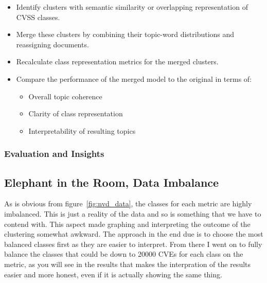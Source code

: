 \documentclass[12pt]{article}
\begin{document}
\begin{itemize}

	\item Identify clusters with semantic similarity or overlapping representation of CVSS classes.

	\item Merge these clusters by combining their topic-word distributions and reassigning documents.

	\item Recalculate class representation metrics for the merged clusters.

	\item Compare the performance of the merged model to the original in terms of:

	      \begin{itemize}

		      \item Overall topic coherence

		      \item Clarity of class representation

		      \item Interpretability of resulting topics

	      \end{itemize}

\end{itemize}

\subsubsection{Evaluation and Insights}

\subsection{Elephant in the Room, Data Imbalance}

As is obvious from figure~\ref{fig:nvd_data}, the classes for each metric are highly imbalanced.
This is just a reality of the data and so is something that we have to contend with. This aspect
made graphing and interpreting the outcome of the clustering somewhat awkward. The approach in the
end due is to choose the most balanced classes first as they are easier to interpret. From there I
went on to fully balance the classes that could be down to 20000 CVEs for each class on the metric,
as you will see in the results that makes the interpration of the results easier and more honest,
even if it is actually showing the same thing.
\end{document}
